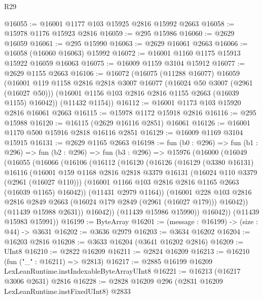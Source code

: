 \begin{lexlean}{R29}
\begin{coremodule}
@16055 := @16001 @1177 @103 @15925 @2816 @15992 @2663
@16058 := @15978 @1176 @15923 @2816
@16059 := @295 @15986
@16060 := @2629 @16059
@16061 := @295 @15990
@16063 := @2629 @16061 @2663
@16066 := @16058 (@16060 @16063) @15992
@16072 := @16001 @1160 @1175 @15913 @15922 @16059 @16063
@16075 := @16009 @1159 @3104 @15912
@16077 := @2629 @1155 @2663
@16106 := @16072
    (@16075
      (@11288 @16077)
      @16059
      (@16001
        @119
        @1158
        @2816
        @2818
        @3007
        @16077
        (@16024 @50 @3007 (@2961 (@16027 @50)))
        (@16001 @1156 @103 @2816 @2816 @1155 @2663 (@16039 @1155) @16042))
      (@11432 @1154))
@16112 := @16001 @1173 @103 @15920 @2816 @16061 @2663
@16115 := @15978 @1172 @15918 @2816
@16116 := @295 @15988
@16120 := @16115 (@2629 @16116 @2851) @16061
@16126 := @16001 @1170 @500 @15916 @2818 @16116 @2851
@16129 := @16009 @1169 @3104 @15915
@16131 := @2629 @1165 @2663
@16198 := fun (b0 : @296) =>
  fun (b1 : @296) =>
  fun (b2 : @296) =>
  fun (b3 : @296) =>
  @15976
    (@16000
      (@16049
        (@16055
          (@16066
            (@16106
              (@16112
                (@16120
                  (@16126
                    (@16129
                      (@3380 @16131)
                      @16116
                      (@16001
                        @159
                        @1168
                        @2816
                        @2818
                        @3379
                        @16131
                        (@16024 @110 @3379 (@2961 (@16027 @110)))
                        (@16001 @1166 @103 @2816 @2816 @1165 @2663 (@16039 @1165) @16042))
                      (@11431 @2979 @1164))
                    (@16001
                      @228
                      @103
                      @2816
                      @2816
                      @2849
                      @2663
                      (@16024 @179 @2849 (@2961 (@16027 @179)))
                      @16042))
                  (@11439 @15988 @2631))
                @16042))
            (@11439 @15986 @15990))
          @16042))
      (@11439 @15983 @15991))
@16199 := ByteArray
@16201 := (message : @16199) -> (size : @44) -> @3631
@16202 := @3636 @2979
@16203 := @3634 @16202
@16204 := @16203 @2816
@16208 := @3633 @16204 (@3641 @16202 @2816)
@16209 := UInt8
@16210 := @2822 @16209
@16211 := @2824 @16209
@16213 := @16210 (fun ("_" : @16211) => @2813)
@16217 := @2885 @16199 @16209 LexLeanRuntime.instIndexableByteArrayUInt8
@16221 := @16213 (@16217 @3006 @2631) @2816
@16228 := @2828 @16209 @296 (@2831 @16209 LexLeanRuntime.instFixedUInt8) @2833

\end{coremodule}
\end{lexlean}
